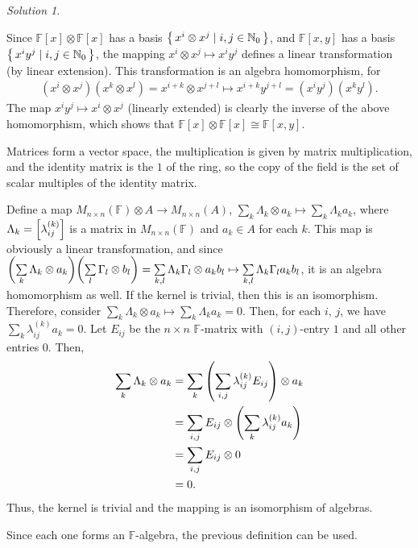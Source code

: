 \documentclass[svgnames]{article}
\theoremstyle{definition}
\theoremstyle{remark}
\newtheorem*{Solution*}{Solution}
\theoremstyle{underline}
\theoremstyle{underline}
\begin{document}
	\begin{Solution*}
		\begin{subquests}
			\item Since $\mathbb F[x] \otimes \mathbb F[x]$ has a basis $\qty{\, x^i \otimes x^j \mid i, j \in \mathbb N_0 \,}$, and $\mathbb F[x, y]$ has a basis $\qty{\, x^i y^j \mid i, j \in \mathbb N_0 \,}$, the mapping $x^i \otimes x^j \mapsto x^i y^j$ defines a linear transformation (by linear extension). This transformation is an algebra homomorphism, for
			\begin{gather*}
			(x^i \otimes x^j) (x^k \otimes x^l) = x^{i + k} \otimes x^{j + l} \mapsto x^{i + k} y^{j + l} = (x^i y^j) (x^k y^l).
			\end{gather*}
			The map $x^i y^j \mapsto x^i \otimes x^j$ (linearly extended) is clearly the inverse of the above homomorphism, which shows that $\mathbb F[x] \otimes \mathbb F[x] \cong \mathbb F[x, y]$.
			\item Matrices form a vector space, the multiplication is given by matrix multiplication, and the identity matrix is the $1$ of the ring, so the copy of the field is the set of scalar multiples of the identity matrix.
			
			Define a map $M_{n \times n} (\mathbb F) \otimes A \to M_{n \times n}(A)$, $\sum\limits_k \Lambda_k \otimes a_k \mapsto \sum\limits_k \Lambda_k a_k$, where $\Lambda_k = \bqty{\lambda^{(k)}_{ij}}$ is a matrix in $M_{n \times n}(\mathbb F)$ and $a_k \in A$ for each $k$. This map is obviously a linear transformation, and since $\pqty{\sum\limits_k \Lambda_k \otimes a_k}\pqty{\sum\limits_l \Gamma_l \otimes b_l} = \sum\limits_{k, l} \Lambda_k \Gamma_l \otimes a_k b_l \mapsto \sum\limits_{k, l} \Lambda_k \Gamma_l a_k b_l$, it is an algebra homomorphism as well. If the kernel is trivial, then this is an isomorphism. Therefore, consider $\sum\limits_k \Lambda_k \otimes a_k \mapsto \sum\limits_k \Lambda_k a_k = 0$. Then, for each $i$, $j$, we have $\sum\limits_k \lambda^{(k)}_{ij} a_k = 0$. Let $E_{ij}$ be the $n \times n$ $\mathbb F$-matrix with $(i,j)$-entry $1$ and all other entries $0$. Then,
			\begin{align*}
				\sum_k \Lambda_k \otimes a_k & = \sum_k \pqty{\sum_{i,j} \lambda^{(k)}_{ij} E_{ij}} \otimes a_k\\
					& = \sum_{i,j} E_{ij} \otimes \pqty{\sum_k \lambda^{(k)}_{ij} a_k}\\
					& = \sum_{i, j} E_{ij} \otimes 0\\
					& = 0.
			\end{align*}
			Thus, the kernel is trivial and the mapping is an isomorphism of algebras.
			\item Since each one forms an $\mathbb F$-algebra, the previous definition can be used.
		\end{subquests}
	\end{Solution*}
\end{document}
